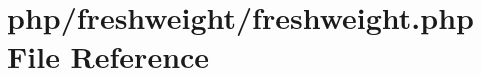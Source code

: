 \hypertarget{freshweight_8php}{\section{php/freshweight/freshweight.php File Reference}
\label{freshweight_8php}
}
